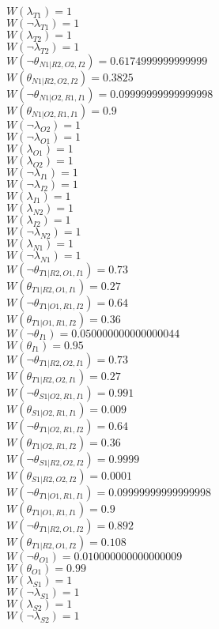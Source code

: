 $W(\lambda_{T1})=1$\\
$W(\neg\lambda_{T1})=1$\\
$W(\lambda_{T2})=1$\\
$W(\neg\lambda_{T2})=1$\\
$W(\neg\theta_{N1|R2,O2,I2})=0.6174999999999999$\\
$W(\theta_{N1|R2,O2,I2})=0.3825$\\
$W(\neg\theta_{N1|O2,R1,I1})=0.09999999999999998$\\
$W(\theta_{N1|O2,R1,I1})=0.9$\\
$W(\neg\lambda_{O2})=1$\\
$W(\neg\lambda_{O1})=1$\\
$W(\lambda_{O1})=1$\\
$W(\lambda_{O2})=1$\\
$W(\neg\lambda_{I1})=1$\\
$W(\neg\lambda_{I2})=1$\\
$W(\lambda_{I1})=1$\\
$W(\lambda_{N2})=1$\\
$W(\lambda_{I2})=1$\\
$W(\neg\lambda_{N2})=1$\\
$W(\lambda_{N1})=1$\\
$W(\neg\lambda_{N1})=1$\\
$W(\neg\theta_{T1|R2,O1,I1})=0.73$\\
$W(\theta_{T1|R2,O1,I1})=0.27$\\
$W(\neg\theta_{T1|O1,R1,I2})=0.64$\\
$W(\theta_{T1|O1,R1,I2})=0.36$\\
$W(\neg\theta_{I1})=0.050000000000000044$\\
$W(\theta_{I1})=0.95$\\
$W(\neg\theta_{T1|R2,O2,I1})=0.73$\\
$W(\theta_{T1|R2,O2,I1})=0.27$\\
$W(\neg\theta_{S1|O2,R1,I1})=0.991$\\
$W(\theta_{S1|O2,R1,I1})=0.009$\\
$W(\neg\theta_{T1|O2,R1,I2})=0.64$\\
$W(\theta_{T1|O2,R1,I2})=0.36$\\
$W(\neg\theta_{S1|R2,O2,I2})=0.9999$\\
$W(\theta_{S1|R2,O2,I2})=0.0001$\\
$W(\neg\theta_{T1|O1,R1,I1})=0.09999999999999998$\\
$W(\theta_{T1|O1,R1,I1})=0.9$\\
$W(\neg\theta_{T1|R2,O1,I2})=0.892$\\
$W(\theta_{T1|R2,O1,I2})=0.108$\\
$W(\neg\theta_{O1})=0.010000000000000009$\\
$W(\theta_{O1})=0.99$\\
$W(\lambda_{S1})=1$\\
$W(\neg\lambda_{S1})=1$\\
$W(\lambda_{S2})=1$\\
$W(\neg\lambda_{S2})=1$\\
